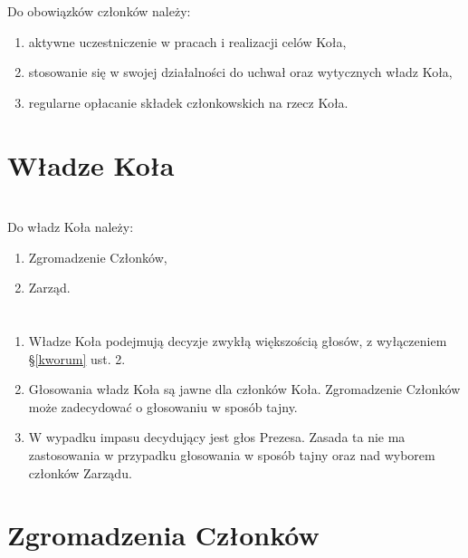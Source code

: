 \documentclass[a4paper]{article}
\begin{document}
\section{}
Do obowiązków członków należy:
\begin{enumerate}[label=\alph*)]
\item aktywne uczestniczenie w pracach i realizacji celów Koła,
\item stosowanie się w swojej działalności do uchwał oraz wytycznych władz Koła,
\item regularne opłacanie składek członkowskich na rzecz Koła.
\end{enumerate}

\section*{Władze Koła~~~}
\section{}

Do władz Koła należy:
\begin{enumerate}[label=\alph*)]
\item Zgromadzenie Członków,
\item Zarząd.
\end{enumerate}

\section{}
\begin{enumerate}
\item Władze Koła podejmują decyzje zwykłą większością głosów, z wyłączeniem \S \ref{kworum} ust. 2.
\item Głosowania władz Koła są jawne dla członków Koła. Zgromadzenie Członków może zadecydować o głosowaniu w sposób tajny.
\item W wypadku impasu decydujący jest głos Prezesa. Zasada ta nie ma zastosowania w przypadku głosowania w sposób tajny oraz nad wyborem członków Zarządu.
\end{enumerate}

\section*{Zgromadzenia Członków~~}
\end{document}
